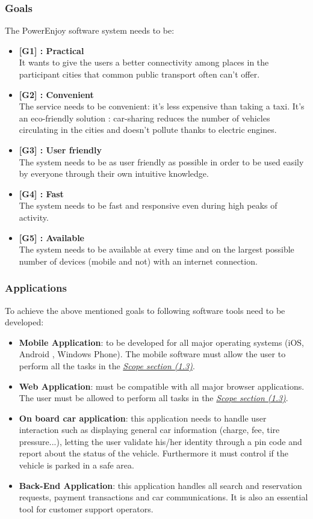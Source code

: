\documentclass[12pt]{article}
\begin{document}
	\subsubsection{Goals}
	The PowerEnjoy software system needs to be:
	\begin{itemize}
		\item \textbf{[G1] : Practical}\\It wants to give the users a better connectivity among places in the participant cities that common public transport often can't offer.
		\item \textbf{[G2] : Convenient}\\The service needs to be convenient: it's less expensive than taking a taxi. It's an eco-friendly solution : car-sharing reduces the number of vehicles circulating in the cities and doesn't pollute thanks to electric engines.
		\item \textbf{[G3] : User friendly}\\ The system needs to be as user friendly as possible in order to be used easily by everyone through their own intuitive knowledge. 
		\item \textbf{[G4] : Fast}\\ The system needs to be fast and responsive even during high peaks of activity.
		\item \textbf{[G5] : Available}\\ The system needs to be available at every time and on the largest possible number of devices (mobile and not) with an internet connection.
	\end{itemize}
	
	\subsubsection{Applications}
	To achieve the above mentioned goals to following software tools need to be developed:
	
	\begin{itemize}
	\item \textbf{Mobile Application}: to be developed for all major operating systems (iOS, Android , Windows Phone). The mobile software must allow the user to perform all the tasks in the \hyperref[scope:1]{\textit{Scope section (1.3)}}.
	\item \textbf{Web Application}: must be compatible with all major browser applications. The user must be allowed to perform all tasks in  the \hyperref[scope:1]{\textit{Scope section (1.3)}}.
	\item \textbf{ On board car application}: this application needs to handle user interaction such as displaying general car information (charge, fee, tire pressure...), letting the user validate his/her identity through a pin code and report about the status of the vehicle. 
Furthermore it must control if the vehicle is parked in a safe area.
	\item \textbf{ Back-End Application}: this application handles all search and reservation requests, payment transactions and car communications. It is also an essential tool for customer support operators.
	
	\end{itemize}
		
\end{document}
